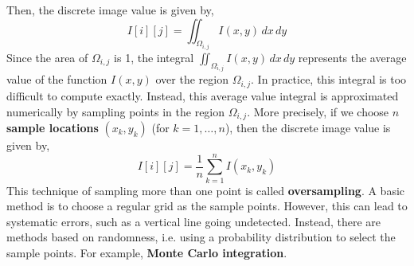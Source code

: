 \documentclass[letterpaper,12pt]{article}
\begin{document}
Then, the discrete image value is given by,
\begin{equation*}
    I[i][j] = \iint_{\Omega_{i,j}} I(x,y) \,dx \,dy
\end{equation*}
Since the area of $\Omega_{i,j}$ is 1, the integral $\iint_{\Omega_{i,j}} I(x,y) \,dx \,dy$ represents the average value of the function $I(x,y)$ over the region $\Omega_{i,j}$. In practice, this integral is too difficult to compute exactly. Instead, this average value integral is approximated numerically by sampling points in the region $\Omega_{i,j}$. More precisely, if we choose $n$ \textbf{sample locations} $(x_k, y_k)$ (for $k = 1, \dots, n$), then the discrete image value is given by,
\begin{equation*}
    I[i][j] = \frac{1}{n} \sum_{k=1}^n I(x_k,y_k)
\end{equation*}
This technique of sampling more than one point is called \textbf{oversampling}. A basic method is to choose a regular grid as the sample points. However, this can lead to systematic errors, such as a vertical line going undetected. Instead, there are methods based on randomness, i.e. using a probability distribution to select the sample points. For example, \textbf{Monte Carlo integration}.
\end{document}
